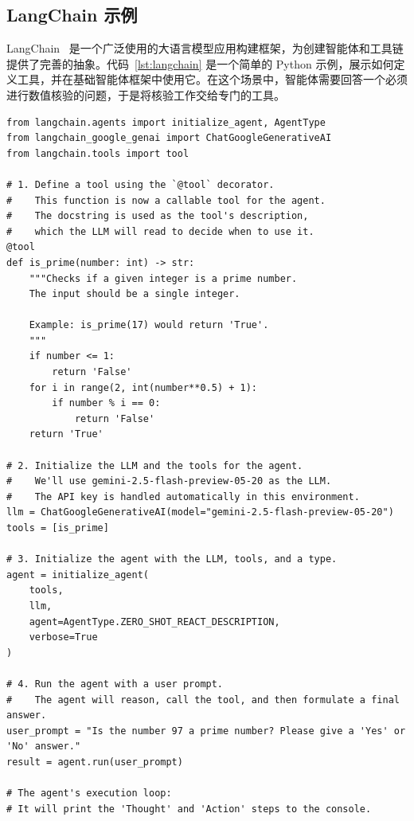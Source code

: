 \subsection{LangChain 示例}
LangChain~\citep{Chase_LangChain_2022} 是一个广泛使用的大语言模型应用构建框架，为创建智能体和工具链提供了完善的抽象。代码~\ref{lst:langchain} 是一个简单的 Python 示例，展示如何定义工具，并在基础智能体框架中使用它。在这个场景中，智能体需要回答一个必须进行数值核验的问题，于是将核验工作交给专门的工具。
\begin{listing}
\begin{verbatim}
from langchain.agents import initialize_agent, AgentType
from langchain_google_genai import ChatGoogleGenerativeAI
from langchain.tools import tool

# 1. Define a tool using the `@tool` decorator.
#    This function is now a callable tool for the agent.
#    The docstring is used as the tool's description,
#    which the LLM will read to decide when to use it.
@tool
def is_prime(number: int) -> str:
    """Checks if a given integer is a prime number.
    The input should be a single integer.
    
    Example: is_prime(17) would return 'True'.
    """
    if number <= 1:
        return 'False'
    for i in range(2, int(number**0.5) + 1):
        if number % i == 0:
            return 'False'
    return 'True'

# 2. Initialize the LLM and the tools for the agent.
#    We'll use gemini-2.5-flash-preview-05-20 as the LLM.
#    The API key is handled automatically in this environment.
llm = ChatGoogleGenerativeAI(model="gemini-2.5-flash-preview-05-20")
tools = [is_prime]

# 3. Initialize the agent with the LLM, tools, and a type.
agent = initialize_agent(
    tools,
    llm,
    agent=AgentType.ZERO_SHOT_REACT_DESCRIPTION,
    verbose=True
)

# 4. Run the agent with a user prompt.
#    The agent will reason, call the tool, and then formulate a final answer.
user_prompt = "Is the number 97 a prime number? Please give a 'Yes' or 'No' answer."
result = agent.run(user_prompt)

# The agent's execution loop:
# It will print the 'Thought' and 'Action' steps to the console.
\end{verbatim}
    \caption{使用 LangChain 定义工具并让智能体调用该工具的示例。}\label{lst:langchain}
\end{listing}


